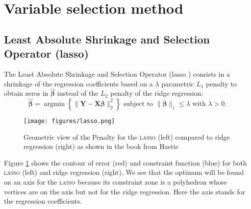 \documentclass[12pt,a4paper]{report}
\begin{document}
		 \FloatBarrier
	\section{Variable selection method}
		\subsection{Least Absolute Shrinkage and Selection Operator ({\sc lasso})}		%

The Least Absolute Shrinkage and Selection Operator ({\sc lasso} \cite{tibshirani1996regression,tibshiranilasso}) consists in a shrinkage of the regression coefficients based on a $\lambda$ parametric $L_1$ penalty to obtain zeros in $\hat{\boldsymbol{\beta}}$ instead of the $L_2$ penalty of the ridge regression:
		\begin{equation}
		 \boldsymbol{\hat{\beta}}=\operatorname{argmin} \left\lbrace \parallel \boldsymbol{Y}-\boldsymbol{X\beta}\parallel_2^2 \right\rbrace \textrm{ subject to } \parallel\boldsymbol{\beta} \parallel_1\leq \lambda \textrm{ with } \lambda>0 .
		\end{equation}	
		
		\begin{figure}[h!]
			\centering
			\texttt{[image: figures/lasso.png]} 
			\caption{Geometric view of the Penalty for the \textsc{lasso} (left) compared to ridge regression (right) as shown in the book from Hastie \cite{hastie2009elements}} \label{lassogeom}
		\end{figure}
		Figure \ref{lassogeom} shows the contour of error (red) and constraint function (blue) for both \textsc{lasso} (left) and ridge regression (right). We see that the optimum will be found on an axis for the \textsc{lasso} because its constraint zone is a polyhedron whose vertices are on the axis but not for the ridge regression. Here the axis stands for the regression coefficients.\\
		
\end{document}
